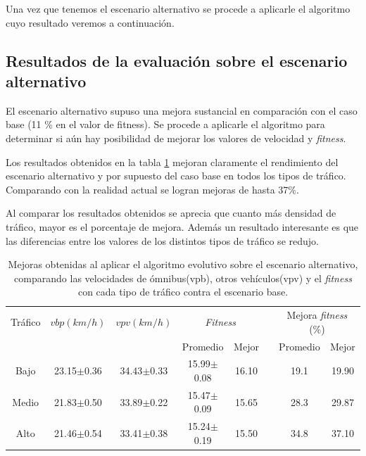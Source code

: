 Una vez que tenemos el escenario alternativo se procede a aplicarle el algoritmo cuyo resultado veremos a continuación.


\subsection{Resultados de la evaluación sobre el escenario alternativo}

El escenario alternativo supuso una mejora sustancial en comparación con el caso base (11 \% en el valor de fitness). Se procede a aplicarle el algoritmo para determinar si aún hay posibilidad de mejorar los valores de velocidad y \emph{fitness}.


Los resultados obtenidos en la tabla \ref{table:mejoras_trafico_alternativo_algoritmo}  mejoran claramente el rendimiento del escenario alternativo y por supuesto del caso base en todos los tipos de tráfico. Comparando con la realidad actual se logran mejoras de hasta 37\%. 

Al comparar los resultados obtenidos se aprecia que cuanto más densidad de tráfico, mayor es el porcentaje de mejora. Además un resultado interesante es que las diferencias entre los valores de los distintos tipos de tráfico se redujo.




\begin{table}[h]
	\renewcommand{\arraystretch}{1.2}
	\caption[Valores numéricos al aplicar el algoritmo evolutivo sobre el escenario alternativo.]{Mejoras obtenidas al aplicar el algoritmo evolutivo sobre el escenario alternativo, comparando las velocidades de ómnibus(vpb), otros vehículos(vpv) y el \emph{fitness} con cada tipo de tráfico contra el escenario base.}
	\label{table:mejoras_trafico_alternativo_algoritmo}
	\centering
	\begin{tabular}{cccccccc}
		\hline 
		Tráfico& 
		$vbp(km/h)$& 
		$vpv(km/h)$&
		\multicolumn{2}{c}{\emph{Fitness}}&  & 
		\multicolumn{2}{c}{Mejora \emph{fitness} (\%)}\\  \cline{4-5} \cline{7-8}&     &     & \multicolumn{1}{c}{Promedio} & \multicolumn{1}{c}{Mejor} &  & \multicolumn{1}{c}{Promedio} & \multicolumn{1}{c}{Mejor} \\ \hline

		Bajo & 23.15$\pm$0.36 & 34.43$\pm$0.33 & 15.99$\pm$0.08 & 16.10 & & 19.1& 19.90 \\
		Medio & 21.83$\pm$0.50  & 33.89$\pm$0.22 & 15.47$\pm$0.09& 15.65 & & 28.3 & 29.87\\
		Alto & 21.46$\pm$0.54  & 33.41$\pm$0.38 & 15.24$\pm$0.19& 15.50 & & 34.8 & 37.10\\	
		\hline		    
	\end{tabular}
\end{table}

